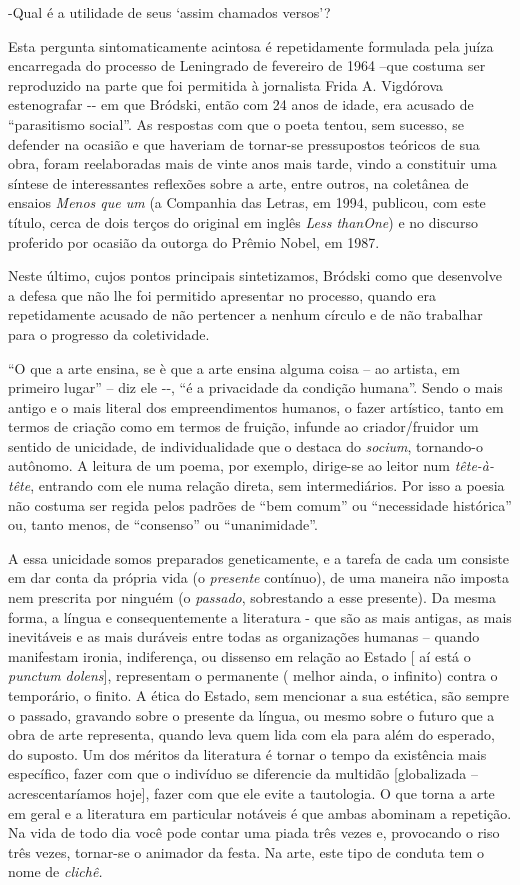 -Qual é a utilidade de seus `assim chamados versos'?

Esta pergunta sintomaticamente acintosa é repetidamente formulada pela
juíza encarregada do processo de Leningrado de fevereiro de 1964 --que
costuma ser reproduzido na parte que foi permitida à jornalista Frida A.
Vigdórova estenografar -\/- em que Bródski, então com 24 anos de idade,
era acusado de ``parasitismo social''. As respostas com que o poeta
tentou, sem sucesso, se defender na ocasião e que haveriam de tornar-se
pressupostos teóricos de sua obra, foram reelaboradas mais de vinte anos
mais tarde, vindo a constituir uma síntese de interessantes reflexões
sobre a arte, entre outros, na coletânea de ensaios \emph{Menos que um}
(a Companhia das Letras, em 1994, publicou, com este título, cerca de
dois terços do original em inglês \emph{Less thanOne}) e no discurso
proferido por ocasião da outorga do Prêmio Nobel, em 1987.

Neste último, cujos pontos principais sintetizamos, Bródski como que
desenvolve a defesa que não lhe foi permitido apresentar no processo,
quando era repetidamente acusado de não pertencer a nenhum círculo e de
não trabalhar para o progresso da coletividade.

``O que a arte ensina, se è que a arte ensina alguma coisa -- ao
artista, em primeiro lugar'' -- diz ele -\/-, ``é a privacidade da
condição humana''. Sendo o mais antigo e o mais literal dos
empreendimentos humanos, o fazer artístico, tanto em termos de criação
como em termos de fruição, infunde ao criador/fruidor um sentido de
unicidade, de individualidade que o destaca do \emph{socium}, tornando-o
autônomo. A leitura de um poema, por exemplo, dirige-se ao leitor num
\emph{tête-à-tête}, entrando com ele numa relação direta, sem
intermediários. Por isso a poesia não costuma ser regida pelos padrões
de ``bem comum'' ou ``necessidade histórica'' ou, tanto menos, de
``consenso'' ou ``unanimidade''.

A essa unicidade somos preparados geneticamente, e a tarefa de cada um
consiste em dar conta da própria vida (o \emph{presente} contínuo), de
uma maneira não imposta nem prescrita por ninguém (o \emph{passado},
sobrestando a esse presente). Da mesma forma, a língua e
consequentemente a literatura - que são as mais antigas, as mais
inevitáveis e as mais duráveis entre todas as organizações humanas --
quando manifestam ironia, indiferença, ou dissenso em relação ao Estado
{[} aí está o \emph{punctum dolens}{]}, representam o permanente (
melhor ainda, o infinito) contra o temporário, o finito. A ética do
Estado, sem mencionar a sua estética, são sempre o passado, gravando
sobre o presente da língua, ou mesmo sobre o futuro que a obra de arte
representa, quando leva quem lida com ela para além do esperado, do
suposto. Um dos méritos da literatura é tornar o tempo da existência
mais específico, fazer com que o indivíduo se diferencie da multidão
{[}globalizada -- acrescentaríamos hoje{]}, fazer com que ele evite a
tautologia. O que torna a arte em geral e a literatura em particular
notáveis é que ambas abominam a repetição. Na vida de todo dia você pode
contar uma piada três vezes e, provocando o riso três vezes, tornar-se o
animador da festa. Na arte, este tipo de conduta tem o nome de
\emph{clichê.}

